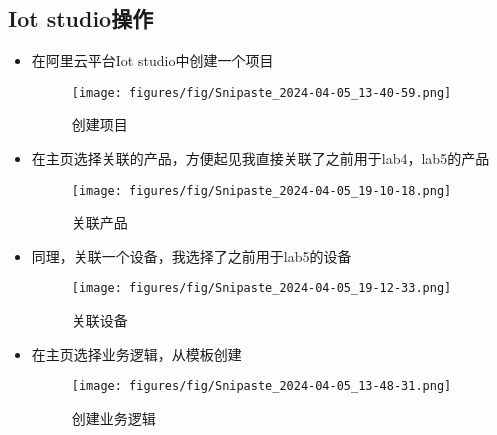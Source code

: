 \documentclass[12pt,hyperref,a4paper,UTF8]{ctexart}
\begin{document}
\subsection*{Iot studio操作}
\begin{itemize}[itemsep=-5pt, topsep=0pt, partopsep=0pt]
    \item 在阿里云平台Iot studio中创建一个项目
    \begin{figure}[H]
        \centering
        \texttt{[image: figures/fig/Snipaste\_2024-04-05\_13-40-59.png]}
        \caption{创建项目}
        \label{fig:enter-label}
    \end{figure}
    \item 在主页选择关联的产品，方便起见我直接关联了之前用于lab4，lab5的产品
    \begin{figure}[H]
        \centering
        \texttt{[image: figures/fig/Snipaste\_2024-04-05\_19-10-18.png]}
        \caption{关联产品}
        \label{fig:enter-label}
    \end{figure}
    \item 同理，关联一个设备，我选择了之前用于lab5的设备
    \begin{figure}[H]
        \centering
        \texttt{[image: figures/fig/Snipaste\_2024-04-05\_19-12-33.png]}
        \caption{关联设备}
        \label{fig:enter-label}
    \end{figure}
    \item 在主页选择业务逻辑，从模板创建
    \begin{figure}[H]
        \centering
        \texttt{[image: figures/fig/Snipaste\_2024-04-05\_13-48-31.png]}
        \caption{创建业务逻辑}
        \label{fig:enter-label}
    \end{figure}
    

\end{itemize}
\end{document}
